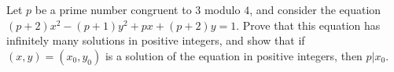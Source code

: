 Let $p$ be a prime number congruent to $3$ modulo $4$, and consider the equation $(p+2)x^{2}-(p+1)y^{2}+px+(p+2)y=1$.
Prove that this equation has infinitely many solutions in positive integers, and show that if $(x,y) = (x_{0}, y_{0})$ is a solution of the equation in positive integers, then $p | x_{0}$.